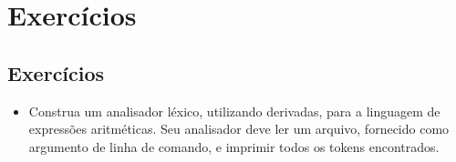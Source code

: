 \documentclass[11pt]{article}
\begin{document}
\section*{Exercícios}
\label{sec:orgb27175d}

\subsection*{Exercícios}
\label{sec:orgfe4ff75}

\begin{itemize}
\item Construa um analisador léxico, utilizando derivadas,  para a linguagem de expressões
aritméticas. Seu analisador deve ler um arquivo, fornecido como argumento de linha
de comando, e imprimir todos os tokens encontrados.
\end{itemize}
\end{document}
